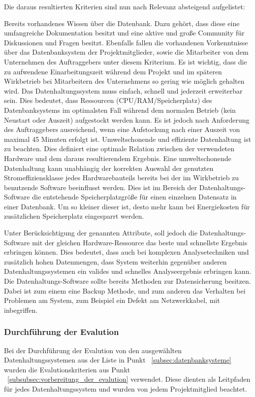 Die daraus resultierten Kriterien sind nun nach Relevanz absteigend
aufgelistet: 
\begin{outline}
  \1 Bereits vorhandenes Wissen über die Datenbank. Dazu gehört,
  dass diese eine umfangreiche Dokumentation besitzt und eine
  aktive und große Community für Diskussionen und Fragen besitzt.
  Ebenfalls fallen die vorhandenen Vorkenntnisse über das 
  Datenbanksystem der Projektmitglieder, sowie die Mitarbeiter
  von dem Unternehmen des Auftraggebers unter diesem Kriterium.
  Es ist wichtig, dass die zu aufwendene Einarbeitungszeit während
  dem Projekt und im späteren Wirkbetrieb bei Mitarbeitern des 
  Unternehmens so gering wie möglich gehalten wird.
  \1 Das Datenhaltungssystem muss einfach, schnell und jederzeit
  erweiterbar sein. Dies bedeutet, dass Ressourcen
  (CPU/RAM/Speicherplatz) des Datenbanksystems im optimalsten Fall
  während dem normalen Betrieb (kein Neustart oder Auszeit)
  aufgestockt werden kann. Es ist jedoch nach Anforderung des
  Auftraggebers ausreichend, wenn eine Aufstockung nach einer Auszeit
  von maximal 45 Minuten erfolgt ist.
  \1 Umweltschonende und effiziente Datenhaltung ist zu beachten. 
  Dies definiert eine optimale Relation zwischen der verwendeten
  Hardware und dem daraus resultierendem Ergebnis. Eine
  umweltschonende Datenhaltung kann unabhängig der korrekten Auswahl
  der genutzten Stromeffiziensklasse jedes Hardwarebauteils bereits
  bei der im Wirkbetrieb zu benutzende Software beeinflusst werden.
  Dies ist im Bereich der Datenhaltungs-Software die
  entstehende Speicherplatzgröße für einen einzelnen Datensatz in
  einer Datenbank. Um so kleiner dieser ist, desto mehr kann bei 
  Energiekosten für zusätzlichen Speicherplatz eingesparrt werden.
  
  Unter Berücksichtigung der genannten Attribute, soll jedoch die
  Datenhaltungs-Software mit der gleichen Hardware-Ressource das
  beste und schnellste Ergebnis erbringen können. Dies bedeutet, 
  dass auch bei komplexen Analysetechniken und zusätzlich hohen
  Datenmengen, dass System weiterhin gegenüber anderen
  Datenhaltungssystemen ein valides und schnelles Analyseergebnis
  erbringen kann.
  \1 Die Datenhaltungs-Software sollte bereits Methoden zur 
  Datensicherung besitzen. Dabei ist zum einem eine Backup Methode,
  und zum anderen das Verhalten bei Problemen am System, zum Beispiel
  ein Defekt am Netzwerkkabel, mit inbegriffen.
\end{outline}
\nl%

\subsubsection{Durchführung der Evalution}
\label{subsubsec:durchfuehrung_der_evalution}
Bei der Durchführung der Evalution von den ausgewählten
Datenhaltungssystemen aus der Liste in Punkt ~\ref{subsec:datenbanksysteme}
wurden die Evalutionskriterien aus Punkt 
~\ref{subsubsec:vorbereitung_der_evalution} verwendet. Diese dienten
als Leitpfaden für jedes Datenhaltungssystem und wurden von jedem
Projektmitglied beachtet.

